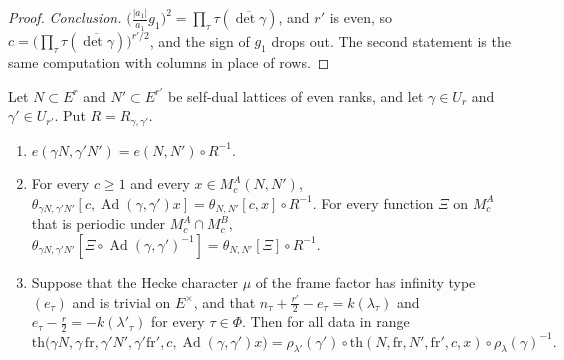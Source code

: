 \begin{proof}
\emph{Conclusion.} $\big(\frac{\lvert a_1\rvert}{a_1}g_1\big)^2=\prod_\tau\tau(\overline{\det\gamma})$, and $r'$ is even, so $c=\big(\prod_\tau\tau(\overline{\det\gamma})\big)^{r'/2}$, and the sign of $g_1$ drops out. The second statement is the same computation with columns in place of rows.
\end{proof}

\begin{proposition}\label{covariance}
Let $N\subset E^r$ and $N'\subset E^{r'}$ be self-dual lattices of even ranks, and let $\gamma\in U_r$ and $\gamma'\in U_{r'}$. Put $R=R_{\gamma,\gamma'}$.
\begin{enumerate}
\item[(i)] $e(\gamma N,\gamma'N')=e(N,N')\circ R^{-1}$.
\item[(ii)] For every $c\ge1$ and every $x\in M^A_c(N,N')$, $\theta_{\gamma N,\gamma'N'}[c,\operatorname{Ad}(\gamma,\gamma')x]=\theta_{N,N'}[c,x]\circ R^{-1}$. For every function $\Xi$ on $M^A_c$ that is periodic under $M^A_c\cap M^B_c$, $\theta_{\gamma N,\gamma'N'}[\Xi\circ\operatorname{Ad}(\gamma,\gamma')^{-1}]=\theta_{N,N'}[\Xi]\circ R^{-1}$.
\item[(iii)] Suppose that the Hecke character $\mu$ of the frame factor has infinity type $(e_\tau)$ and is trivial on $E^\times$, and that $n_\tau+\frac{r'}2-e_\tau=k(\lambda_\tau)$ and $e_\tau-\frac r2=-k(\lambda'_\tau)$ for every $\tau\in\Phi$. Then for all data in range
\[
\mathrm{th}\big(\gamma N,\gamma\,\mathrm{fr},\gamma'N',\gamma'\mathrm{fr}',c,\operatorname{Ad}(\gamma,\gamma')x\big)=\rho_{\lambda'}(\gamma')\circ\mathrm{th}(N,\mathrm{fr},N',\mathrm{fr}',c,x)\circ\rho_\lambda(\gamma)^{-1}.
\]
\end{enumerate}
\end{proposition}

